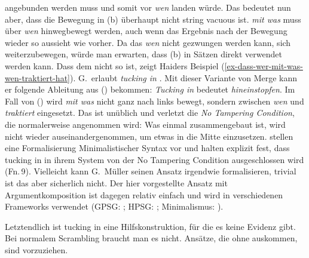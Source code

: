 angebunden werden muss und somit vor \emph{wen} landen würde. Das bedeutet nun aber, dass die
Bewegung in (b) überhaupt nicht string vacuous ist. \emph{mit was} muss über \emph{wen}
hinwegbewegt werden, auch wenn das Ergebnis nach der Bewegung wieder so aussieht wie vorher. Da das
\emph{wen} nicht gezwungen werden kann, sich weiterzubewegen, würde man erwarten, dass (b)
in Sätzen direkt verwendet werden kann. Dass dem nicht so ist, zeigt Haiders Beispiel
(\ref{ex-dass-wer-mit-was-wen-traktiert-hat}). G.\,\citet[80]{GMueller2014a-u} erlaubt \emph{tucking
  in} \citep[99]{Richards2001a-u}. Mit dieser Variante von Merge kann er folgende Ableitung aus () bekommen:
\z
\emph{Tucking in} bedeutet \emph{hineinstopfen}. Im Fall von () wird \emph{mit was} nicht
ganz nach links bewegt, sondern zwischen \emph{wen} und \emph{traktiert} eingesetzt. Das ist
unüblich und verletzt die \emph{No Tampering Condition}, die normalerweise angenommen wird: Was
einmal zusammengebaut ist, wird nicht wieder auseinandergenommen, um etwas in die Mitte einzusetzen. \citet{CS2016a-u} stellen eine
Formalisierung Minimalistischer Syntax vor und halten explizit fest, dass tucking in in ihrem
System von der No Tampering Condition ausgeschlossen wird (Fn.\,9). Vielleicht kann G.\ Müller
seinen Ansatz irgendwie formalisieren, trivial ist das aber sicherlich nicht. Der hier vorgestellte
Ansatz mit Argumentkomposition ist dagegen relativ einfach und wird in verschiedenen Frameworks verwendet
(GPSG: \citealt[878]{Johnson86a}; HPSG: \citealt{HN94a,Kiss95a,Mueller96a,Meurers2000b};
Minimalismus: \citealt[618--643]{Sternefeld2006a-u}). 

Letztendlich ist tucking in eine Hilfskonstruktion, für die es keine Evidenz gibt. Bei normalem
Scrambling braucht man es nicht. Ansätze, die ohne auskommen, sind vorzuziehen.





